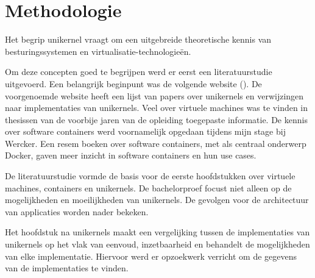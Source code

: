 \chapter{Methodologie}
\label{ch:methodologie}

Het begrip unikernel vraagt om een uitgebreide theoretische kennis van besturingssystemen en virtualisatie-technologieën.

Om deze concepten goed te begrijpen werd er eerst een literatuurstudie uitgevoerd.
Een belangrijk beginpunt was de volgende website (\cite{unikernel_systems_unikernels_2016}). De voorgenoemde website heeft een lijst van papers over unikernels en verwijzingen naar implementaties van unikernels.
Veel over virtuele machines was te vinden in thesissen van de voorbije jaren van de opleiding toegepaste informatie. De kennis over software containers werd voornamelijk opgedaan tijdens mijn stage bij Wercker. Een resem boeken over software containers, met als centraal onderwerp Docker, gaven meer inzicht in software containers en hun use cases.

De literatuurstudie vormde de basis voor de eerste hoofdstukken over virtuele machines, containers en unikernels. De bachelorproef focust niet alleen op de mogelijkheden en moeilijkheden van unikernels. De gevolgen voor de architectuur van applicaties worden nader bekeken.

Het hoofdstuk na unikernels maakt een vergelijking tussen de implementaties van unikernels op het vlak van eenvoud, inzetbaarheid en behandelt de mogelijkheden van elke implementatie. Hiervoor werd er opzoekwerk verricht om de gegevens van de implementaties te vinden.